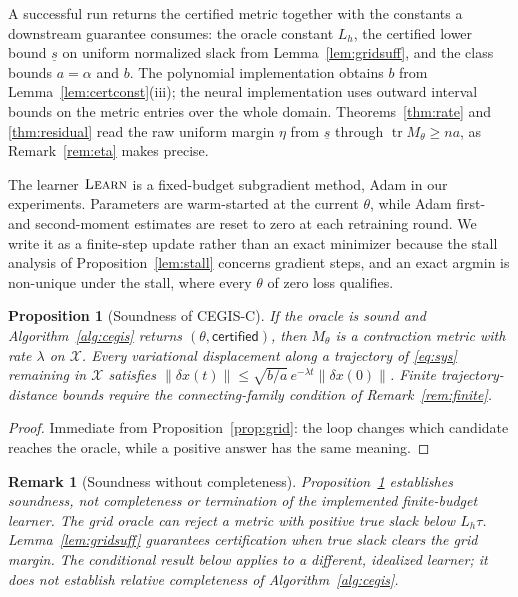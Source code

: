 \documentclass[12pt,onecolumn,journal]{IEEEtran}
\newtheorem{proposition}{Proposition}
\newtheorem{remark}{Remark}
\newcommand{\X}{\mathcal{X}}
\providecommand{\tr}{}
\renewcommand{\tr}{\operatorname{tr}}
\begin{document}
A successful run returns the certified metric together with the constants a downstream guarantee consumes: the oracle constant $L_h$, the certified lower bound $\underline s$ on uniform normalized slack from Lemma~\ref{lem:gridsuff}, and the class bounds $a=\alpha$ and $b$. The polynomial implementation obtains $b$ from Lemma~\ref{lem:certconst}(iii); the neural implementation uses outward interval bounds on the metric entries over the whole domain. Theorems~\ref{thm:rate} and \ref{thm:residual} read the raw uniform margin $\eta$ from $\underline s$ through $\tr M_\theta\ge na$, as Remark~\ref{rem:eta} makes precise.

The learner $\textsc{Learn}$ is a fixed-budget subgradient method, Adam in our experiments. Parameters are warm-started at the current $\theta$, while Adam first- and second-moment estimates are reset to zero at each retraining round. We write it as a finite-step update rather than an exact minimizer because the stall analysis of Proposition~\ref{lem:stall} concerns gradient steps, and an exact argmin is non-unique under the stall, where every $\theta$ of zero loss qualifies.

\begin{proposition}[Soundness of CEGIS-C]
\label{prop:cegis}
If the oracle is sound and Algorithm~\ref{alg:cegis} returns $(\theta, \textsf{certified})$, then $M_\theta$ is a contraction metric with rate $\lambda$ on $\X$. Every variational displacement along a trajectory of \eqref{eq:sys} remaining in $\X$ satisfies $\|\delta x(t)\| \le \sqrt{b/a}\, e^{-\lambda t}\|\delta x(0)\|$. Finite trajectory-distance bounds require the connecting-family condition of Remark~\ref{rem:finite}.
\end{proposition}

\begin{proof}
Immediate from Proposition~\ref{prop:grid}: the loop changes which candidate reaches the oracle, while a positive answer has the same meaning.
\end{proof}

\begin{remark}[Soundness without completeness]
\label{rem:complete}
Proposition~\ref{prop:cegis} establishes soundness, not completeness or termination of the implemented finite-budget learner. The grid oracle can reject a metric with positive true slack below $L_h\tau$. Lemma~\ref{lem:gridsuff} guarantees certification when true slack clears the grid margin. The conditional result below applies to a different, idealized learner; it does not establish relative completeness of Algorithm~\ref{alg:cegis}.
\end{remark}
\end{document}
